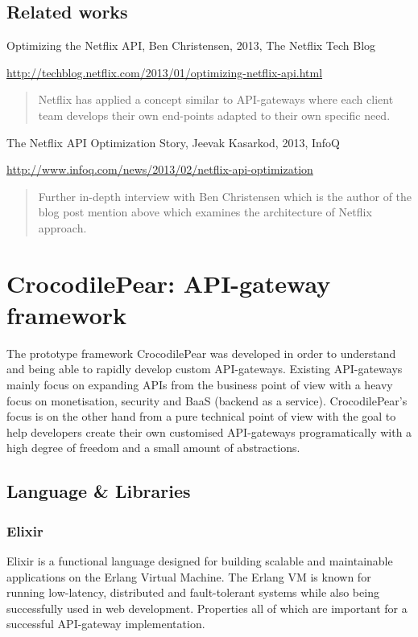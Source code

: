 \documentclass{cslthse-msc}
\begin{document}
\section{Related works}
Optimizing the Netflix API, Ben Christensen, 2013, The Netflix Tech Blog

\noindent \url{http://techblog.netflix.com/2013/01/optimizing-netflix-api.html}

\begin{quote}
	Netflix has applied a concept similar to API-gateways where each client team develops their own end-points adapted to their own specific need.
\end{quote}

\vspace{5mm}

\noindent The Netflix API Optimization Story, Jeevak Kasarkod, 2013, InfoQ

\noindent \url{http://www.infoq.com/news/2013/02/netflix-api-optimization}

\begin{quote}
	Further in-depth interview with Ben Christensen which is the author of the blog post mention above which examines the architecture of Netflix approach.
\end{quote}

\chapter{CrocodilePear: API-gateway framework}

The prototype framework CrocodilePear was developed in order to understand and being able to rapidly develop custom API-gateways. Existing API-gateways mainly focus on expanding APIs from the business point of view with a heavy focus on monetisation, security and BaaS (backend as a service). CrocodilePear's focus is on the other hand from a pure technical point of view with the goal to help developers create their own customised API-gateways programatically with a high degree of freedom and a small amount of abstractions.

\section{Language \& Libraries}
\subsection{Elixir}
Elixir is a functional language designed for building scalable and maintainable applications on the Erlang Virtual Machine. The Erlang VM is known for running low-latency, distributed and fault-tolerant systems while also being successfully used in web development\cite{elixir}. Properties all of which are important for a successful API-gateway implementation.
\end{document}

